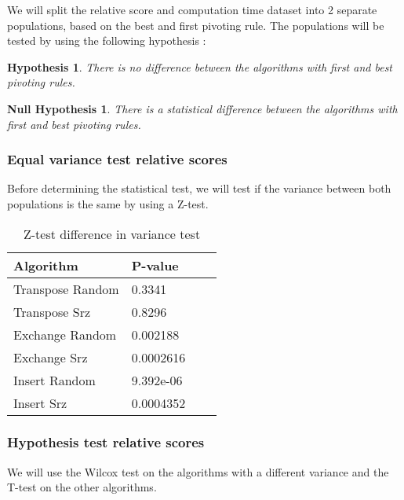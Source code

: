 \documentclass[]{article}
\newtheorem{hypothesis}{Hypothesis}
\newtheorem{nullhypothesis}{Null Hypothesis}
\begin{document}
	We will split the relative score and computation time dataset into 2 separate populations, based on the best and first pivoting rule.
	\newline The populations will be tested by using the following hypothesis :
	\begin{hypothesis}There is no difference between the algorithms with first and best pivoting rules.\end{hypothesis}
	\begin{nullhypothesis}There is a statistical difference between the algorithms with first and best pivoting rules.\end{nullhypothesis}
	
	
	
	\subsubsection{Equal variance test relative scores}
	
	Before determining the statistical test, we will test if the variance between both populations is the same by using a Z-test.
	
	\begin{table}[H]
		\centering
		\caption{Z-test difference in variance test}
		\label{tab:table1}
		\begin{tabular}{l{|}lll}
			\toprule
			Algorithm & P-value\\
			\midrule
			Transpose Random & \color{Red}0.3341\\ 
			Transpose Srz  &\color{Red}0.8296\\ 
			Exchange Random 	&\color{OliveGreen}0.002188\\ 
			Exchange Srz &\color{OliveGreen}0.0002616\\ 
			Insert Random  &\color{OliveGreen}9.392e-06\\ 
			Insert Srz 	&\color{OliveGreen}0.0004352\\	
			\bottomrule
		\end{tabular}
	\end{table}
	\subsubsection{Hypothesis test relative scores}
	We will use the Wilcox test on the algorithms with a different variance and the T-test on the other algorithms.
	
\end{document}
